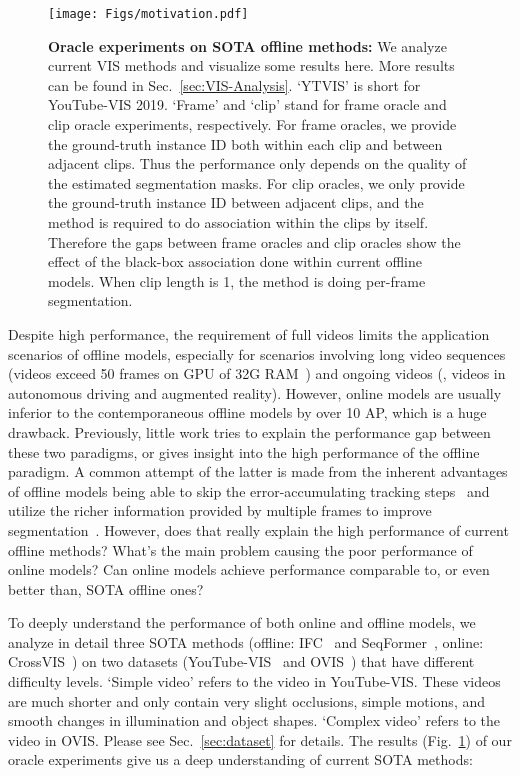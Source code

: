 \documentclass[runningheads]{llncs}
\begin{document}
\begin{figure}[t]
	\centering
	\texttt{[image: Figs/motivation.pdf]}
	\caption{\textbf{Oracle experiments on SOTA offline methods: } We analyze current VIS methods and visualize some results here. More results can be found in Sec.~\ref{sec:VIS-Analysis}. `YTVIS' is short for YouTube-VIS 2019. `Frame' and `clip' stand for frame oracle and clip oracle experiments, respectively. For frame oracles, we provide the ground-truth instance ID both within each clip and between adjacent clips. Thus the performance only depends on the quality of the estimated segmentation masks. For clip oracles, we only provide the ground-truth instance ID between adjacent clips, and the method is required to do association within the clips by itself. Therefore the gaps between frame oracles and clip oracles show the effect of the black-box association done within current offline models. When clip length is 1, the method is doing per-frame segmentation.}
	\label{fig:motivation}
\end{figure}


Despite high performance, the requirement of full videos limits the application scenarios of offline models, especially for scenarios involving long video sequences (videos exceed 50 frames on GPU of 32G RAM~\cite{seqformer}) and ongoing videos (\eg, videos in autonomous driving and augmented reality). However, online models are usually inferior to the contemporaneous offline models by over 10 AP, which is a huge drawback. Previously, little work tries to explain the performance gap between these two paradigms, or gives insight into the high performance of the offline paradigm. A common attempt of the latter is made from the inherent advantages of offline models being able to skip the error-accumulating tracking steps~\cite{ProposeReduce} and utilize the richer information provided by multiple frames to improve segmentation~\cite{IFC,STEmSEG,seqformer,efficient}. However, does that really explain the high performance of current offline methods? What's the main problem causing the poor performance of online models? Can online models achieve performance comparable to, or even better than, SOTA offline ones?

To deeply understand the performance of both online and offline models, we analyze in detail three SOTA methods (offline: IFC~\cite{IFC} and SeqFormer~\cite{seqformer}, online: CrossVIS~\cite{CrossVIS}) on two datasets (YouTube-VIS~\cite{MaskTrackRCNN} and OVIS~\cite{ovis}) that have different difficulty levels. `Simple video' refers to the video in YouTube-VIS. These videos are much shorter and only contain very slight occlusions, simple motions, and smooth changes in illumination and object shapes. `Complex video' refers to the video in OVIS. Please see Sec.~\ref{sec:dataset} for details. The results (Fig.~\ref{fig:motivation}) of our oracle experiments give us a deep understanding of current SOTA methods:
\end{document}

